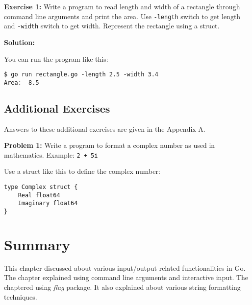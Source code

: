 {\bfseries Exercise 1:} Write a program to read length and width of a
rectangle through command line arguments and print the area.
Use \texttt{-length} switch to get length and \texttt{-width} switch
to get width.  Represent the rectangle using a struct.

\textbf{Solution:}



You can run the program like this:

\begin{lstlisting}[numbers=none]
$ go run rectangle.go -length 2.5 -width 3.4
Area:  8.5
\end{lstlisting}

\subsection{Additional Exercises}

Answers to these additional exercises are given in the Appendix A.

\textbf{Problem 1:} Write a program to format a complex number as used in mathematics.  Example: \texttt{2 + 5i}

Use a struct like this to define the complex number:

\begin{lstlisting}[numbers=none]
type Complex struct {
    Real float64
    Imaginary float64
}
\end{lstlisting}


\section*{Summary}

This chapter discussed about various input/output related
functionalities in Go.  The chapter explained using command line
arguments and interactive input.  The chaptered using \textit{flag}
package.  It also explained about various string formatting
techniques.
